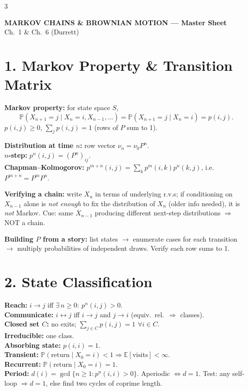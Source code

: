 \documentclass[8pt]{extarticle}
\newcommand{\E}{\mathbb{E}}
\newcommand{\PR}{\mathbb{P}}
\begin{document}
	\footnotesize
	\begin{multicols*}{3}
		
		\begin{center}
			\textbf{\normalsize MARKOV CHAINS \& BROWNIAN MOTION --- Master Sheet}\\[-2pt]
			{\scriptsize Ch.~1 \& Ch.~6 (Durrett)}
		\end{center}
		
		\section*{1. Markov Property \& Transition Matrix}
		
		\textbf{Markov property:} for state space $S$,
		\[\PR(X_{n+1}=j\mid X_n=i,X_{n-1},\dots)=\PR(X_{n+1}=j\mid X_n=i)=p(i,j).\]
		$p(i,j)\ge 0$, $\sum_j p(i,j)=1$ (rows of $P$ sum to 1).
		
		\textbf{Distribution at time $n$:} row vector $\nu_n=\nu_0 P^n$.\\
		\textbf{$n$-step:} $p^n(i,j)=(P^n)_{ij}$.\\
		\textbf{Chapman--Kolmogorov:} $p^{m+n}(i,j)=\sum_k p^m(i,k)p^n(k,j)$, i.e.\ $P^{m+n}=P^mP^n$.
		
		\textbf{Verifying a chain:} write $X_n$ in terms of underlying r.v.s; if conditioning on $X_{n-1}$ alone is \emph{not enough} to fix the distribution of $X_n$ (older info needed), it is \emph{not} Markov. Cue: same $X_{n-1}$ producing different next-step distributions $\Rightarrow$ NOT a chain.
		
		\textbf{Building $P$ from a story:} list states $\to$ enumerate cases for each transition $\to$ multiply probabilities of independent draws. Verify each row sums to 1.
		
		\section*{2. State Classification}
		
		\textbf{Reach:} $i\to j$ iff $\exists\,n\ge 0:\ p^n(i,j)>0$.\\
		\textbf{Communicate:} $i\leftrightarrow j$ iff $i\to j$ and $j\to i$ (equiv.\ rel.\ $\Rightarrow$ classes).\\
		\textbf{Closed set $C$:} no exits; $\sum_{j\in C}p(i,j)=1$ $\forall i\in C$.\\
		\textbf{Irreducible:} one class.\\
		\textbf{Absorbing state:} $p(i,i)=1$.\\
		\textbf{Transient:} $\PR(\text{return}\mid X_0=i)<1\Rightarrow\E[\text{visits}]<\infty$.\\
		\textbf{Recurrent:} $\PR(\text{return}\mid X_0=i)=1$.\\
		\textbf{Period:} $d(i)=\gcd\{n\ge 1:p^n(i,i)>0\}$. Aperiodic $\Leftrightarrow d=1$. Test: any self-loop $\Rightarrow d=1$, else find two cycles of coprime length.
		

\end{multicols*}
\end{document}
